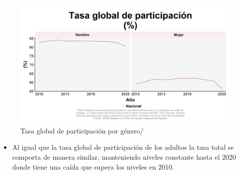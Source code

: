     \begin{figure}[H]
        \caption{Tasa global de participación por género/ \label{map_result_2} }
        \begin{center}
        \includegraphics[width=\textwidth,keepaspectratio]{img/var_79_trend.png}
        \end{center}
    \end{figure}
            \begin{itemize}
                \item Al igual que la tasa global de participación de los adultos la tasa total se comporta de manera similar, manteniendo niveles constante hasta el 2020 donde tiene una caída que supera los niveles en 2010.
                \end{itemize}

